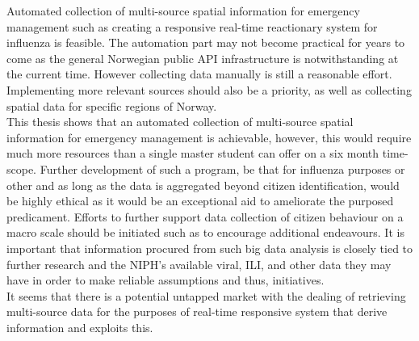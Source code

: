 Automated collection of multi-source spatial information for emergency management such as creating a responsive real-time reactionary system for influenza is feasible.
The automation part may not become practical for years to come as the general Norwegian public API infrastructure is notwithstanding at the current time. However collecting data manually is still a reasonable effort. Implementing more relevant sources should also be a priority, as well as collecting spatial data for specific regions of Norway.
\\
This thesis shows that an automated collection of multi-source spatial information for emergency management is achievable, however, this would require much more resources than a single master student can offer on a six month time-scope. Further development of such a program, be that for influenza purposes or other and as long as the data is aggregated beyond citizen identification, would be highly ethical as it would be an exceptional aid to ameliorate the purposed predicament. Efforts to further support data collection of citizen behaviour on a macro scale should be initiated such as to encourage additional endeavours.
It is important that information procured from such big data analysis is closely tied to further research and the NIPH's available viral, ILI, and other data they may have in order to make reliable assumptions and thus, initiatives.\\
It seems that there is a potential untapped market with the dealing of retrieving multi-source data for the purposes of real-time responsive system that derive information and exploits this.













































